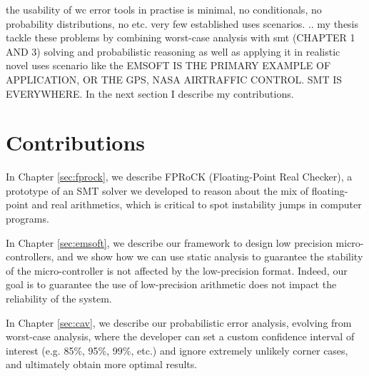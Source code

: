 %

the usability of wc error tools in practise is minimal, no conditionals, no probability distributions, no etc. very few established uses scenarios. 
.. my thesis tackle these problems by combining worst-case analysis with smt (CHAPTER 1 AND 3) solving and probabilistic reasoning as well as applying it in realistic novel uses scenario like the EMSOFT IS THE PRIMARY EXAMPLE OF APPLICATION, OR THE GPS, NASA AIRTRAFFIC CONTROL.
SMT IS EVERYWHERE. 
%
In the next section I describe my contributions.
%
\section{Contributions}
%
In Chapter \ref{sec:fprock}, we describe FPRoCK (Floating-Point Real Checker), a prototype of an SMT solver we developed to reason about the mix of floating-point and real arithmetics, which is critical to spot instability jumps in computer programs.

%
%
%
%
In Chapter \ref{sec:emsoft}, we describe our framework to design low precision micro-controllers, and we show how we can use static analysis to guarantee the stability of the micro-controller is not affected by the low-precision format.
%
Indeed, our goal is to guarantee the use of low-precision arithmetic does not impact the reliability of the system.

%
%

%
%
%
In Chapter \ref{sec:cav}, we describe our probabilistic error analysis, evolving from worst-case analysis, where the developer can set a custom confidence interval of interest (e.g. 85\%, 95\%, 99\%, etc.) and ignore extremely unlikely corner cases, and ultimately obtain more optimal results.
%

